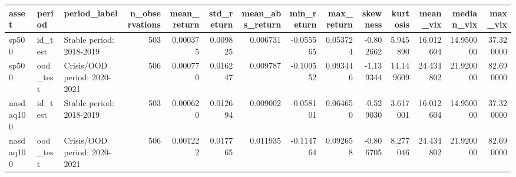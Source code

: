 \begin{tabular}{lllrrrrrrrrrrr}
\toprule
asset & period & period_label & n_observations & mean_return & std_return & mean_abs_return & min_return & max_return & skewness & kurtosis & mean_vix & median_vix & max_vix \\
\midrule
sp500 & id_test & Stable period: 2018-2019 & 503 & 0.000375 & 0.009825 & 0.006731 & -0.055565 & 0.053724 & -0.802662 & 5.945890 & 16.012604 & 14.950000 & 37.320000 \\
sp500 & ood_test & Crisis/OOD period: 2020-2021 & 506 & 0.000770 & 0.016247 & 0.009787 & -0.109552 & 0.093446 & -1.139344 & 14.149609 & 24.434802 & 21.920000 & 82.690000 \\
nasdaq100 & id_test & Stable period: 2018-2019 & 503 & 0.000620 & 0.012694 & 0.009002 & -0.058101 & 0.064650 & -0.529030 & 3.617001 & 16.012604 & 14.950000 & 37.320000 \\
nasdaq100 & ood_test & Crisis/OOD period: 2020-2021 & 506 & 0.001222 & 0.017765 & 0.011935 & -0.114764 & 0.092658 & -0.806705 & 8.277046 & 24.434802 & 21.920000 & 82.690000 \\
\bottomrule
\end{tabular}
